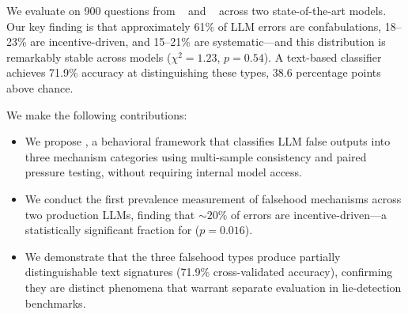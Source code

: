 We evaluate \ours on 900 questions from \syceval~\citep{sharma2024towards} and \truthfulqa~\citep{lin2021truthfulqa} across two state-of-the-art models. Our key finding is that approximately 61\% of LLM errors are confabulations, 18--23\% are incentive-driven, and 15--21\% are systematic---and this distribution is remarkably stable across models ($\chi^2 = 1.23$, $p = 0.54$). A text-based classifier achieves 71.9\% accuracy at distinguishing these types, 38.6 percentage points above chance.

We make the following contributions:
\begin{itemize}[leftmargin=*,itemsep=0pt,topsep=0pt]
    \item We propose \ours, a behavioral framework that classifies LLM false outputs into three mechanism categories using multi-sample consistency and paired pressure testing, without requiring internal model access.
    \item We conduct the first prevalence measurement of falsehood mechanisms across two production LLMs, finding that ${\sim}20\%$ of errors are incentive-driven---a statistically significant fraction for \gemini ($p = 0.016$).
    \item We demonstrate that the three falsehood types produce partially distinguishable text signatures (71.9\% cross-validated accuracy), confirming they are distinct phenomena that warrant separate evaluation in lie-detection benchmarks.
\end{itemize}
